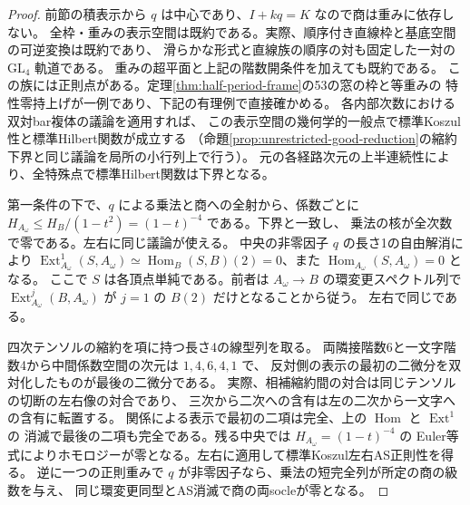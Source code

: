 \begin{proof}
前節の積表示から $q$ は中心であり、$I+kq=K$ なので商は重みに依存しない。
全枠・重みの表示空間は既約である。実際、順序付き直線枠と基底空間の可逆変換は既約であり、
滑らかな形式と直線族の順序の対も固定した一対の $\mathrm{GL}_4$ 軌道である。
重みの超平面と上記の階数開条件を加えても既約である。
この族には正則点がある。定理\ref{thm:half-period-frame}の53の窓の枠と等重みの
特性零持上げが一例であり、下記の有理例で直接確かめる。
各内部次数における双対bar複体の議論を適用すれば、
この表示空間の幾何学的一般点で標準Koszul性と標準Hilbert関数が成立する
（命題\ref{prop:unrestricted-good-reduction}の縮約下界と同じ議論を局所の小行列上で行う）。
元の各経路次元の上半連続性により、全特殊点で標準Hilbert関数は下界となる。

第一条件の下で、$q$ による乗法と商への全射から、係数ごとに
$H_{A_\omega}\le H_B/(1-t^2)=(1-t)^{-4}$ である。下界と一致し、
乗法の核が全次数で零である。左右に同じ議論が使える。
中央の非零因子 $q$ の長さ1の自由解消により
$\operatorname{Ext}_{A_\omega}^1(S,A_\omega)
\simeq\operatorname{Hom}_B(S,B)(2)=0$、また $\operatorname{Hom}_{A_\omega}(S,A_\omega)=0$ となる。
ここで $S$ は各頂点単純である。前者は $A_\omega\to B$ の環変更スペクトル列で
$\operatorname{Ext}_{A_\omega}^j(B,A_\omega)$ が $j=1$ の $B(2)$ だけとなることから従う。
左右で同じである。

四次テンソルの縮約を項に持つ長さ4の線型列を取る。
両隣接階数6と一文字階数4から中間係数空間の次元は $1,4,6,4,1$ で、
反対側の表示の最初の二微分を双対化したものが最後の二微分である。
実際、相補縮約間の対合は同じテンソルの切断の左右像の対合であり、
三次から二次への含有は左の二次から一文字への含有に転置する。
関係による表示で最初の二項は完全、上の $\operatorname{Hom}$ と $\operatorname{Ext}^1$ の
消滅で最後の二項も完全である。残る中央では $H_{A_\omega}=(1-t)^{-4}$ の
Euler等式によりホモロジーが零となる。左右に適用して標準Koszul左右AS正則性を得る。
逆に一つの正則重みで $q$ が非零因子なら、乗法の短完全列が所定の商の級数を与え、
同じ環変更同型とAS消滅で商の両socleが零となる。
\end{proof}

